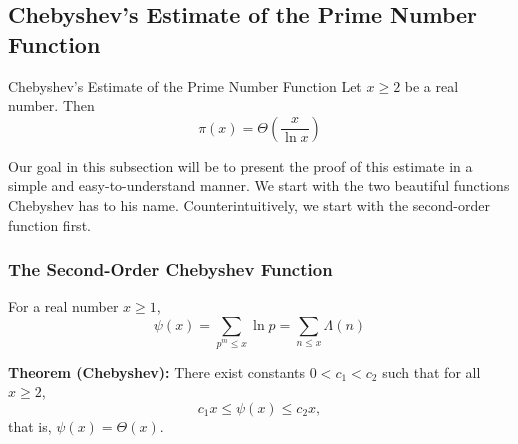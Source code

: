 \documentclass[a4paper,11pt,abstracton]{scrartcl}
\theoremstyle{dotlessP}
\theoremstyle{dotlessS}
\theoremstyle{remark}
\theoremstyle{definition}
\begin{document}
\subsection{Chebyshev's Estimate of the Prime Number Function}

\begin{mainbox}{Chebyshev's Estimate of the Prime Number Function}
Let $x\ge 2$ be a real number. Then
$$\pi(x) = \Theta\!\left(\frac{x}{\ln x}\right)$$
\end{mainbox}

Our goal in this subsection will be to present the proof of this estimate in a simple and easy-to-understand manner. We start with the two beautiful functions Chebyshev has to his name. Counterintuitively, we start with the second-order function first.

\subsubsection*{The Second-Order Chebyshev Function}

\begin{definition_box}
For a real number $x \ge 1$,
$$\psi(x) = \sum_{p^m \le x}\ln p = \sum_{n \le x}\Lambda(n)$$
\end{definition_box}

\begin{problem_box}
\textbf{Theorem (Chebyshev):}
There exist constants $0<c_1<c_2$ such that for all $x\ge 2$,
\[c_1x \le \psi(x) \le c_2x,\]
that is, $\psi(x)=\Theta(x)$. 
\end{problem_box}
\end{document}

